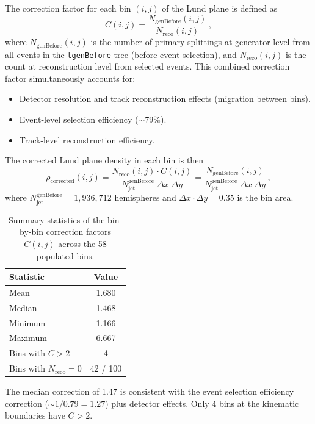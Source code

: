 \documentclass[11pt,a4paper]{article}
\begin{document}
The correction factor for each bin $(i,j)$ of the Lund plane is
defined as
\begin{equation}
  C(i,j) = \frac{N_\text{genBefore}(i,j)}{N_\text{reco}(i,j)}\,,
  \label{eq:correction}
\end{equation}
where $N_\text{genBefore}(i,j)$ is the number of primary splittings at
generator level from all events in the \texttt{tgenBefore} tree (before
event selection), and $N_\text{reco}(i,j)$ is the count at reconstruction
level from selected events.  This combined correction factor
simultaneously accounts for:
\begin{itemize}
\item Detector resolution and track reconstruction effects
  (migration between bins).
\item Event-level selection efficiency ($\sim\!79\%$).
\item Track-level reconstruction efficiency.
\end{itemize}

The corrected Lund plane density in each bin is then
\begin{equation}
  \rho_\text{corrected}(i,j) =
  \frac{N_\text{reco}(i,j) \cdot C(i,j)}
       {N_\text{jet}^\text{genBefore}\;\Delta x\;\Delta y}
  = \frac{N_\text{genBefore}(i,j)}
         {N_\text{jet}^\text{genBefore}\;\Delta x\;\Delta y}\,,
  \label{eq:corrected-density}
\end{equation}
where $N_\text{jet}^\text{genBefore} = 1{,}936{,}712$ hemispheres and
$\Delta x \cdot \Delta y = 0.35$ is the bin area.

\begin{table}[htbp]
\centering
\caption{Summary statistics of the bin-by-bin correction factors
  $C(i,j)$ across the 58 populated bins.}
\label{tbl:correction-stats}
\begin{tabular}{lc}
\toprule
Statistic & Value \\
\midrule
Mean & 1.680 \\
Median & 1.468 \\
Minimum & 1.166 \\
Maximum & 6.667 \\
Bins with $C > 2$ & 4 \\
Bins with $N_\text{reco} = 0$ & 42 / 100 \\
\bottomrule
\end{tabular}
\end{table}

The median correction of 1.47 is consistent with the event selection
efficiency correction ($\sim\!1/0.79 = 1.27$) plus detector effects.
Only 4 bins at the kinematic boundaries have $C > 2$.
\end{document}
